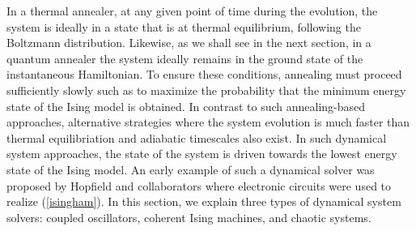 \documentclass[fleqn,10pt]{wlscirep}
\def\change#1{#1}
\begin{document}
In a thermal annealer, at any given point of time during the evolution, the system is ideally in a state that is at thermal equilibrium, following the Boltzmann distribution. Likewise, \change{as we shall see in the next section, } in a quantum annealer the system ideally remains in the ground state of the instantaneous Hamiltonian. To ensure these conditions, annealing must proceed sufficiently slowly such as to maximize the probability that the minimum energy state of the Ising model is obtained. In contrast to such annealing-based approaches, alternative strategies where the system evolution is much faster than thermal equilibriation and adiabatic timescales also exist. In such dynamical system approaches, the state of the system is driven towards the lowest energy state of the Ising model.  An early example of such a dynamical solver was proposed by Hopfield and collaborators  \cite{hopfield1982neural,hopfield1985neural} where electronic circuits were used to realize (\ref{isingham}). In this section, we explain three types of dynamical system solvers: coupled oscillators, coherent Ising machines, and chaotic systems.

\end{document}

